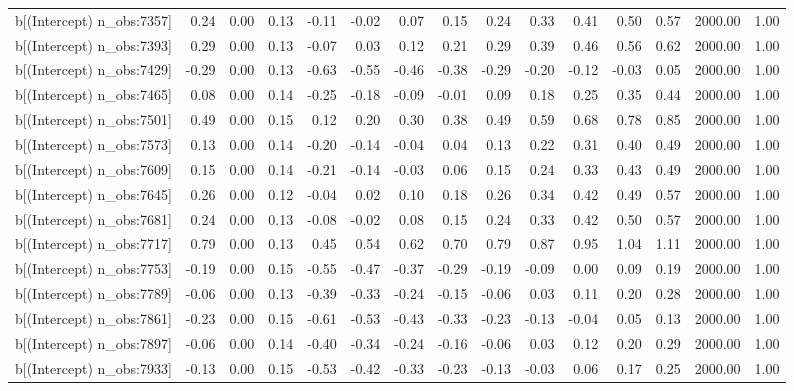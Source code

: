 \begin{table}[ht]
\begin{tabular}{rrrrrrrrrrrrrrr}
  b[(Intercept) n\_obs:7357] & 0.24 & 0.00 & 0.13 & -0.11 & -0.02 & 0.07 & 0.15 & 0.24 & 0.33 & 0.41 & 0.50 & 0.57 & 2000.00 & 1.00 \\ 
  b[(Intercept) n\_obs:7393] & 0.29 & 0.00 & 0.13 & -0.07 & 0.03 & 0.12 & 0.21 & 0.29 & 0.39 & 0.46 & 0.56 & 0.62 & 2000.00 & 1.00 \\ 
  b[(Intercept) n\_obs:7429] & -0.29 & 0.00 & 0.13 & -0.63 & -0.55 & -0.46 & -0.38 & -0.29 & -0.20 & -0.12 & -0.03 & 0.05 & 2000.00 & 1.00 \\ 
  b[(Intercept) n\_obs:7465] & 0.08 & 0.00 & 0.14 & -0.25 & -0.18 & -0.09 & -0.01 & 0.09 & 0.18 & 0.25 & 0.35 & 0.44 & 2000.00 & 1.00 \\ 
  b[(Intercept) n\_obs:7501] & 0.49 & 0.00 & 0.15 & 0.12 & 0.20 & 0.30 & 0.38 & 0.49 & 0.59 & 0.68 & 0.78 & 0.85 & 2000.00 & 1.00 \\ 
  b[(Intercept) n\_obs:7573] & 0.13 & 0.00 & 0.14 & -0.20 & -0.14 & -0.04 & 0.04 & 0.13 & 0.22 & 0.31 & 0.40 & 0.49 & 2000.00 & 1.00 \\ 
  b[(Intercept) n\_obs:7609] & 0.15 & 0.00 & 0.14 & -0.21 & -0.14 & -0.03 & 0.06 & 0.15 & 0.24 & 0.33 & 0.43 & 0.49 & 2000.00 & 1.00 \\ 
  b[(Intercept) n\_obs:7645] & 0.26 & 0.00 & 0.12 & -0.04 & 0.02 & 0.10 & 0.18 & 0.26 & 0.34 & 0.42 & 0.49 & 0.57 & 2000.00 & 1.00 \\ 
  b[(Intercept) n\_obs:7681] & 0.24 & 0.00 & 0.13 & -0.08 & -0.02 & 0.08 & 0.15 & 0.24 & 0.33 & 0.42 & 0.50 & 0.57 & 2000.00 & 1.00 \\ 
  b[(Intercept) n\_obs:7717] & 0.79 & 0.00 & 0.13 & 0.45 & 0.54 & 0.62 & 0.70 & 0.79 & 0.87 & 0.95 & 1.04 & 1.11 & 2000.00 & 1.00 \\ 
  b[(Intercept) n\_obs:7753] & -0.19 & 0.00 & 0.15 & -0.55 & -0.47 & -0.37 & -0.29 & -0.19 & -0.09 & 0.00 & 0.09 & 0.19 & 2000.00 & 1.00 \\ 
  b[(Intercept) n\_obs:7789] & -0.06 & 0.00 & 0.13 & -0.39 & -0.33 & -0.24 & -0.15 & -0.06 & 0.03 & 0.11 & 0.20 & 0.28 & 2000.00 & 1.00 \\ 
  b[(Intercept) n\_obs:7861] & -0.23 & 0.00 & 0.15 & -0.61 & -0.53 & -0.43 & -0.33 & -0.23 & -0.13 & -0.04 & 0.05 & 0.13 & 2000.00 & 1.00 \\ 
  b[(Intercept) n\_obs:7897] & -0.06 & 0.00 & 0.14 & -0.40 & -0.34 & -0.24 & -0.16 & -0.06 & 0.03 & 0.12 & 0.20 & 0.29 & 2000.00 & 1.00 \\ 
  b[(Intercept) n\_obs:7933] & -0.13 & 0.00 & 0.15 & -0.53 & -0.42 & -0.33 & -0.23 & -0.13 & -0.03 & 0.06 & 0.17 & 0.25 & 2000.00 & 1.00 \\ 

\end{tabular}
\end{table}
